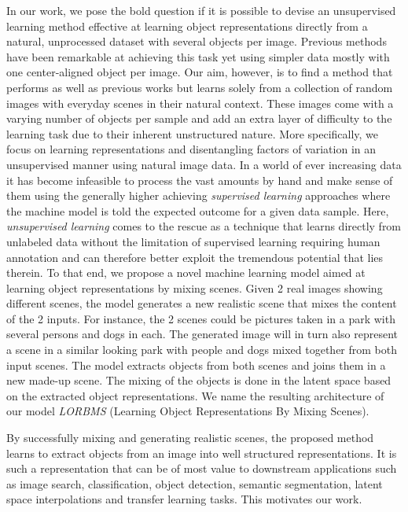 \documentclass[a4paper,12pt]{report}
\begin{document}
In our work, we pose the bold question if it is possible to devise an unsupervised learning method effective at learning object representations directly from a natural, unprocessed dataset with several objects per image. Previous methods have been remarkable at achieving this task yet using simpler data mostly with one center-aligned object per image. Our aim, however, is to find a method that performs as well as previous works but learns solely from a collection of random images with everyday scenes in their natural context. These images come with a varying number of objects per sample and add an extra layer of difficulty to the learning task due to their inherent unstructured nature. More specifically, we focus on learning representations and disentangling factors of variation in an unsupervised manner using natural image data. In a world of ever increasing data it has become infeasible to process the vast amounts by hand and make sense of them using the generally higher achieving \textit{supervised learning} approaches where the machine model is told the expected outcome for a given data sample. Here, \textit{unsupervised learning} comes to the rescue as a technique that learns directly from unlabeled data without the limitation of supervised learning requiring human annotation and can therefore better exploit the tremendous potential that lies therein. To that end, we propose a novel machine learning model aimed at learning object representations by mixing scenes. Given 2 real images showing different scenes, the model generates a new realistic scene that mixes the content of the 2 inputs. For instance, the 2 scenes could be pictures taken in a park with several persons and dogs in each. The generated image will in turn also represent a scene in a similar looking park with people and dogs mixed together from both input scenes. The model extracts objects from both scenes and joins them in a new made-up scene. The mixing of the objects is done in the latent space based on the extracted object representations. We name the resulting architecture of our model \textit{LORBMS} (Learning Object Representations By Mixing Scenes).


By successfully mixing and generating realistic scenes, the proposed method learns to extract objects from an image into well structured representations. It is such a representation that can be of most value to downstream applications such as image search, classification, object detection, semantic segmentation, latent space interpolations and transfer learning tasks. This motivates our work.
\end{document}
